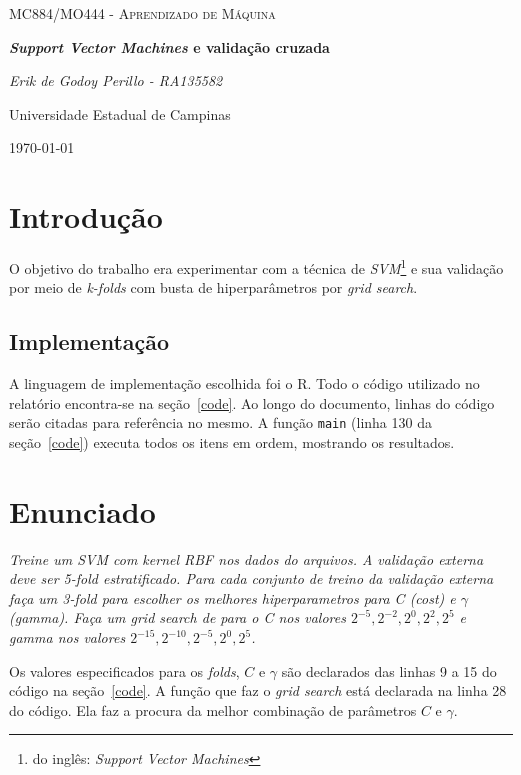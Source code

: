 \documentclass[10pt]{article}
\newcommand{\fromeng}[1]{\footnote{do inglês: \textit{#1}}}
\newcommand{\tit}[1]{\textit{#1}}
\newcommand{\ttt}[1]{\texttt{#1}}
\begin{document}
\begin{titlepage}
	\centering
	{\scshape\Large MC884/MO444 - Aprendizado de Máquina\par}
	\vspace{1.5cm}
	{\huge\bfseries \tit{Support Vector Machines} e validação cruzada\par}
	\vspace{1cm}
	{\itshape Erik de Godoy Perillo - RA135582\par}
	\vfill
	Universidade Estadual de Campinas 
	\vfill
	{\large \today\par}
\end{titlepage}

\newpage

\section{Introdução}
O objetivo do trabalho era experimentar com a técnica de 
\tit{SVM}\fromeng{Support Vector Machines} e sua validação por meio de
\tit{k-folds} com busta de hiperparâmetros por \tit{grid search}.

\subsection{Implementação}
A linguagem de implementação escolhida foi o R.
Todo o código utilizado no relatório encontra-se na seção~\ref{code}.
Ao longo do documento, linhas do código serão citadas para referência no mesmo.
A função \ttt{main} (linha 130 da seção~\ref{code}) executa todos os itens em
ordem, mostrando os resultados.

\section{Enunciado}
\tit{Treine um SVM com kernel RBF nos dados do arquivos.
A validação externa deve ser 5-fold estratificado.
Para cada conjunto de treino da validação externa faça um 3-fold para 
escolher os melhores hiperparametros para C (cost) e $\gamma$ (gamma).
Faça um grid search de para o C nos valores $2^{-5}, 2^{-2}, 2^0, 2^2, 2^5$ 
e gamma nos valores $2^{-15}, 2^{-10}, 2^{-5}, 2^0, 2^5$.}\newline

Os valores especificados para os \tit{folds}, $C$ e $\gamma$
são declarados das linhas 9 a 15 do código na seção~\ref{code}. 
A função que faz o \tit{grid search} está declarada na linha
28 do código. 
Ela faz a procura da melhor combinação de parâmetros $C$ e $\gamma$.
\end{document}
